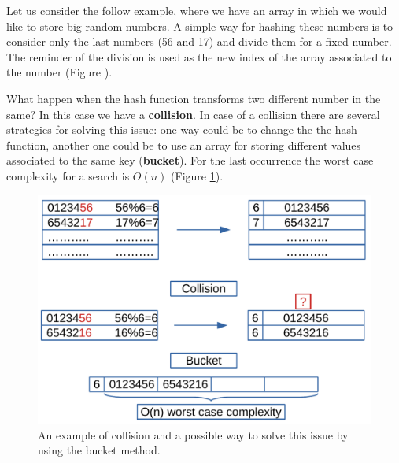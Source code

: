 Let us consider the follow example, where we have an array in which we would like to store big random numbers. A simple way for hashing these numbers is to consider only the last numbers (56 and 17) and divide them for a fixed number. The reminder of the division is used as the new index of the array associated to the number (Figure ).

What happen when the hash function transforms two different number in the same? In this case we have a \textbf{collision}. In case of a collision there are several strategies for solving this issue: one way could be to change the the hash function, another one could be to use an array for storing different values associated to the same key (\textbf{bucket}). For the last occurrence the worst case complexity for a search is \(O(n)\) (Figure \ref{map_2}).

\begin{figure}[H]
	\begin{center}
		\includegraphics[scale=.6]{chapters/datastructures/images/map_2.pdf}
		\caption[An example of collision and a possible way to solve this issue by using the bucket method.]{An example of collision and a possible way to solve this issue by using the bucket method.}
		\label{map_2}
	\end{center}
\end{figure}

